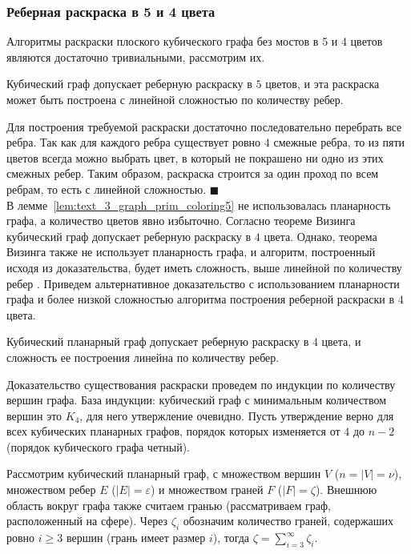 \subsubsection{Реберная раскраска в 5 и 4 цвета}

Алгоритмы раскраски плоского кубического графа без мостов в 5 и 4 цветов являются достаточно тривиальными, рассмотрим их.

\begin{lemma}\label{lem:text_3_graph_prim_coloring5}
Кубический граф допускает реберную раскраску в $5$ цветов, и эта раскраска может быть построена с линейной сложностью по количеству ребер.
\end{lemma}
Для построения требуемой раскраски достаточно последовательно перебрать все ребра.
Так как для каждого ребра существует ровно $4$ смежные ребра, то из пяти цветов всегда можно выбрать цвет, в который не покрашено ни одно из этих смежных ребер.
Таким образом, раскраска строится за один проход по всем ребрам, то есть с линейной сложностью.
$\blacksquare$\\

В лемме~\ref{lem:text_3_graph_prim_coloring5} не использовалась планарность графа, а количество цветов явно избыточно.
Согласно теореме Визинга \cite{Vizing1964,Vizing1965} кубический граф допускает реберную раскраску в $4$ цвета.
Однако, теорема Визинга также не использует планарность графа, и алгоритм, построенный исходя из доказательства, будет иметь сложность, выше линейной по количеству ребер \cite{Soifer2009}.
Приведем альтернативное доказательство с использованием планарности графа и более низкой сложностью алгоритма построения реберной раскраски в $4$ цвета.

\begin{lemma}\label{lem:text_3_graph_prim_coloring4}
Кубический планарный граф допускает реберную раскраску в $4$ цвета, и сложность ее построения линейна по количеству ребер.
\end{lemma}

Доказательство существования раскраски проведем по индукции по количеству вершин графа.
База индукции: кубический граф с минимальным количеством вершин это $K_4$, для него утвержление очевидно.
Пусть утверждение верно для всех кубических планарных графов, порядок которых изменяется от $4$ до $n - 2$ (порядок кубического графа четный).

Рассмотрим кубический планарный граф, с множеством вершин $V$ ($n = |V| = \nu$), множеством ребер $E$ ($|E| = \varepsilon$) и множеством граней $F$ ($|F| = \zeta$).
Внешнюю область вокруг графа также считаем гранью (рассматриваем граф, расположенный на сфере).
Через $\zeta_i$ обозначим количество граней, содержаших ровно $i \ge 3$ вершин (грань имеет размер $i$), тогда $\zeta = \sum_{i = 3}^{\infty}{\zeta_i}$.

